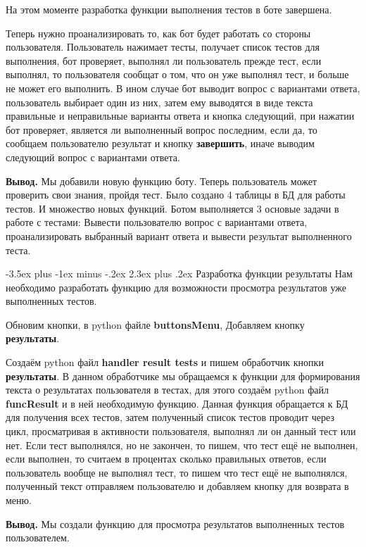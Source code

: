 \documentclass[12pt, oldlfont, amsfonts]{report}
\makeatletter
\renewcommand{\section}{\@startsection{section}{1}{0pt}%
                                {-3.5ex plus -1ex minus -.2ex}%
                                {2.3ex plus .2ex}%
{\centering\hyphenpenalty=10000\normalfont\Large\bfseries}}
\makeatother
\begin{document}
На этом моменте разработка функции выполнения тестов в боте завершена. 

Теперь нужно проанализировать то, как бот будет работать со стороны пользователя. Пользователь нажимает тесты, получает список тестов для выполнения, бот проверяет, выполнял ли пользователь прежде тест, если выполнял, то пользователя сообщат о том, что он уже выполнял тест, и больше не может его выполнить. В ином случае бот выводит вопрос с вариантами ответа, пользователь выбирает один из них, затем ему выводятся в виде текста правильные и неправильные варианты ответа и кнопка следующий, при нажатии бот проверяет, является ли выполненный вопрос последним, если да, то сообщаем пользователю результат и кнопку {\bf завершить}, иначе выводим следующий вопрос с вариантами ответа.

{\bf Вывод.} Мы добавили новую функцию боту. Теперь пользователь может проверить свои знания, пройдя тест. Было создано 4 таблицы в БД для работы тестов. И множество новых функций. Ботом выполняется 3 основые задачи в работе с тестами: Вывести пользователю вопрос с вариантами ответа, проанализировать выбранный вариант ответа и вывести результат выполненного теста.

\section{Разработка функции результаты}
Нам необходимо разработать функцию для возможности просмотра результатов уже выполненных тестов.

Обновим кнопки, в python файле {\bf buttonsMenu}, Добавляем кнопку {\bf результаты}.

Создаём python файл {\bf handler result tests} и пишем обработчик кнопки {\bf результаты}. В данном обработчике мы обращаемся к функции для формирования текста о результатах пользователя в тестах, для этого создаём python файл {\bf funcResult} и в ней необходимую функцию. Данная функция обращается к БД для получения всех тестов, затем полученный список тестов проводит через цикл, просматривая в активности пользователя, выполнял ли он данный тест или нет. Если тест выполнялся, но не закончен, то пишем, что тест ещё не выполнен, если выполнен, то считаем в процентах сколько правильных ответов, если пользователь вообще не выполнял тест, то пишем что тест ещё не выполнялся, полученный текст отправляем пользователю и добавляем кнопку для возврата в меню.

{\bf Вывод.} Мы создали функцию для просмотра результатов выполненных тестов пользователем.
\end{document}
